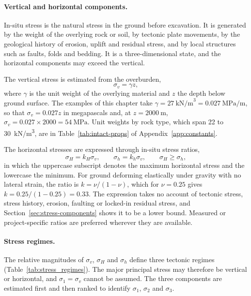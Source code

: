 \paragraph{Vertical and horizontal components.}
In-situ stress is the natural stress in the ground before excavation. It is
generated by the weight of the overlying rock or soil, by tectonic plate
movements, by the geological history of erosion, uplift and residual stress,
and by local structures such as faults, folds and bedding. It is a
three-dimensional state, and the horizontal components may exceed the
vertical.

The vertical stress is estimated from the overburden,
\[
\sigma_v = \gamma z ,
\]
where \(\gamma\) is the unit weight of the overlying material and \(z\) the
depth below ground surface. The examples of this chapter take
\(\gamma = 27~\text{kN/m}^3 = 0.027~\text{MPa/m}\), so that
\(\sigma_v = 0.027z\) in megapascals and, at \(z=2000~\text{m}\),
\(\sigma_v = 0.027 \times 2000 = 54~\text{MPa}\). Unit weights by rock type,
which span 22 to 30~kN/m\textsuperscript{3}, are in
Table~\ref{tab:intact-props} of Appendix~\ref{app:constants}.

The horizontal stresses are expressed through in-situ stress ratios,
\[
\sigma_H = k_H \sigma_v ,
\qquad
\sigma_h = k_h \sigma_v ,
\qquad
\sigma_H \geq \sigma_h ,
\]
in which the uppercase subscript denotes the maximum horizontal stress and the
lowercase the minimum. For ground deforming elastically under gravity with no
lateral strain, the ratio is \(k = \nu/(1-\nu)\), which for \(\nu = 0.25\)
gives \(k = 0.25/(1-0.25) = 0.33\). The expression takes no account of
tectonic stress, stress history, erosion, faulting or locked-in residual
stress, and Section~\ref{sec:stress-components} shows it to be a lower bound.
Measured or project-specific ratios are preferred wherever they are
available.

\paragraph{Stress regimes.}
The relative magnitudes of \(\sigma_v\), \(\sigma_H\) and \(\sigma_h\) define
three tectonic regimes (Table~\ref{tab:stress_regimes}). The major principal
stress may therefore be vertical or horizontal, and \(\sigma_1=\sigma_v\)
cannot be assumed. The three components are estimated first and then ranked to
identify \(\sigma_1\), \(\sigma_2\) and \(\sigma_3\).

